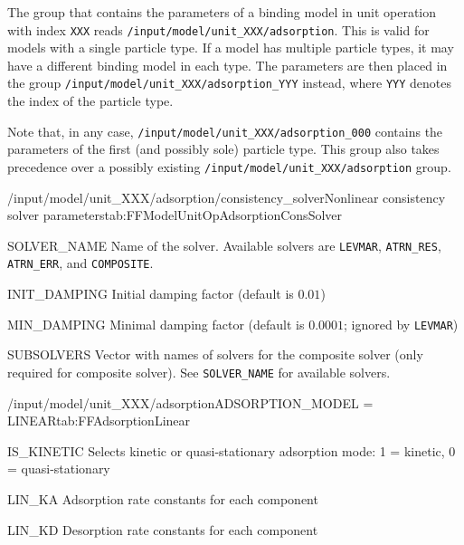 The group that contains the parameters of a binding model in unit operation with index \texttt{XXX} reads \texttt{/input/model/unit\_XXX/adsorption}.
This is valid for models with a single particle type.
If a model has multiple particle types, it may have a different binding model in each type.
The parameters are then placed in the group \texttt{/input/model/unit\_XXX/adsorption\_YYY} instead, where \texttt{YYY} denotes the index of the particle type.

Note that, in any case, \texttt{/input/model/unit\_XXX/adsorption\_000} contains the parameters of the first (and possibly sole) particle type.
This group also takes precedence over a possibly existing \texttt{/input/model/unit\_XXX/adsorption} group.

\begin{subgroup}{/input/model/unit\_XXX/adsorption/consistency\_solver}{Nonlinear consistency solver parameters}{tab:FFModelUnitOpAdsorptionConsSolver}
  \begin{dataset}[type=string,length=1]{SOLVER\_NAME}
    Name of the solver.
    Available solvers are \texttt{LEVMAR}, \texttt{ATRN\_RES}, \texttt{ATRN\_ERR}, and \texttt{COMPOSITE}.
  \end{dataset}
  \begin{dataset}[type=double,range={$\geq 0$},length=1]{INIT\_DAMPING}
    Initial damping factor (default is $0.01$)
  \end{dataset}
  \begin{dataset}[type=double,range={$\geq 0$},length=1]{MIN\_DAMPING}
    Minimal damping factor (default is $0.0001$; ignored by \texttt{LEVMAR})
  \end{dataset}
  \begin{dataset}[type=string,length={$> 1$}]{SUBSOLVERS}
    Vector with names of solvers for the composite solver (only required for composite solver).
    See \texttt{SOLVER\_NAME} for available solvers.
  \end{dataset}
\end{subgroup}

\begin{condsubgroup}{/input/model/unit\_XXX/adsorption}{ADSORPTION\_MODEL = LINEAR}{tab:FFAdsorptionLinear}
  \begin{dataset}[type=int,range={$\{ 0,1 \}$},length=1]{IS\_KINETIC}
    Selects kinetic or quasi-stationary adsorption mode: 1 = kinetic, 0 = quasi-stationary
  \end{dataset}
  \begin{dataset}[unit=\si{\cubic\metre\of{MP}\per\cubic\metre\of{SP}\per\second},type=double,range={$\geq 0$},length={\texttt{NCOMP}}]{LIN\_KA}
    Adsorption rate constants for each component
  \end{dataset}
  \begin{dataset}[unit=\si{\per\second},type=double,range={$\geq 0$},length={\texttt{NCOMP}}]{LIN\_KD}
    Desorption rate constants for each component
  \end{dataset}
\end{condsubgroup}

